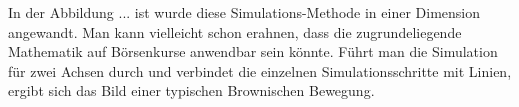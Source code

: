 In der Abbildung ... ist wurde diese Simulations-Methode in einer Dimension angewandt. Man kann vielleicht schon erahnen, dass die zugrundeliegende Mathematik auf Börsenkurse anwendbar sein könnte. Führt man die Simulation für zwei Achsen durch und verbindet die einzelnen Simulationsschritte mit Linien, ergibt sich das Bild einer typischen Brownischen Bewegung.


%
